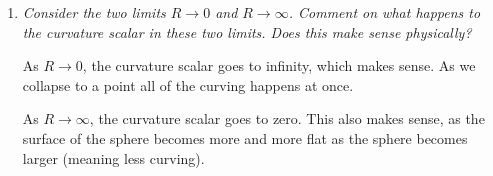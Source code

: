 \documentclass[11pt]{article}
\begin{document}
\begin{enumerate}[label=\alph*)]
The elements of the Ricci tensor are $\displaystyle{R^\alpha_{\beta \alpha \nu}}$. Using this, it is easy to get that the Ricci tensor is 
\[R_{\beta\nu} = \mqty[1&0\\0&1] \, .\]
This gives us a Ricci scalar, or curvature scalar, of
\begin{align*}
R  = g^{\beta\nu}R_{\beta\nu} & = \frac{1}{R^2} + \frac{1}{R^2\sin[2](\theta)}\\
& = \frac{1}{R^2}\left(1 + \frac{1}{\sin[2](\theta)}\right)\\
& = \frac{1}{R^2}\left(1 + \csc[2](\theta)\right) \, .
\end{align*}

\item \textit{Consider the two limits $R\rightarrow 0 $ and $R\rightarrow \infty$. Comment on what happens to the curvature scalar in these two limits. Does this make sense physically?}

As $R\rightarrow 0$, the curvature scalar goes to infinity, which makes sense. As we collapse to a point all of the curving happens at once. 

As $R\rightarrow \infty$, the curvature scalar goes to zero. This also makes sense, as the surface of the sphere becomes more and more flat as the sphere becomes larger (meaning less curving). 

\end{enumerate}
\end{document}
